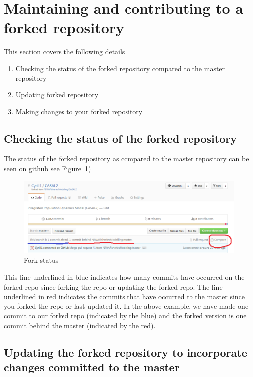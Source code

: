 \section{Maintaining and contributing to a forked repository\label{sec:maintain_repo}}

This section covers the following details

\begin{enumerate}
	\item Checking the status of the forked repository compared to the master repository
	\item Updating forked repository
	\item Making changes to your forked repository
\end{enumerate}

\subsection{Checking the status of the forked repository}

The status of the forked repository as compared to the master repository can be seen on github see Figure~\ref{fig:fork_status})

\begin{figure}[!ht]
	\centering
	\includegraphics[scale=0.6]{Figures/fork_status.png}
	\caption{Fork status}\label{fig:fork_status}
\end{figure}

This line underlined in blue indicates how many commits have occurred on the forked repo since forking the repo or updating the forked repo. The line underlined in red indicates the commits that have occurred to the master since you forked the repo or last updated it. In the above example, we have made one commit to our forked repo (indicated by the blue) and the forked version is one commit behind the master (indicated by the red). 



\subsection{Updating the forked repository to incorporate changes committed to the master}


